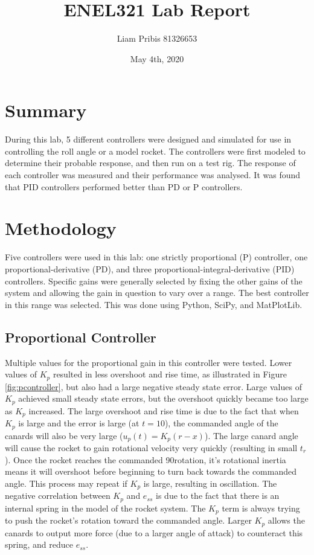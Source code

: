 \documentclass[12pt]{article}
\title{ENEL321 Lab Report}
\author{Liam Pribis 81326653}
\date{May 4th, 2020}
\begin{document}
\clearpage\maketitle
\thispagestyle{empty}
\newpage
\setcounter{page}{1}
\section{Summary}
During this lab, 5 different controllers were designed and simulated for use in controlling the roll angle or a model rocket. The controllers were first modeled to determine their probable response, and then run on a test rig. The response of each controller was measured and their performance was analysed. It was found that PID controllers performed better than PD or P controllers.

\section{Methodology}
Five controllers were used in this lab: one strictly proportional (P) controller, one proportional-derivative (PD), and three proportional-integral-derivative (PID) controllers.
Specific gains were generally selected by fixing the other gains of the system and allowing the gain in question to vary over a range. The best controller in this range was selected.
This was done using Python, SciPy, and MatPlotLib.
\subsection{Proportional Controller}
Multiple values for the proportional gain in this controller were tested. Lower values of $K_p$
resulted in less overshoot and rise time, as illustrated in Figure \ref{fig:pcontroller}, but also had a large negative steady state error. Large values of $K_p$ achieved small steady state errors, but the overshoot quickly became too large as $K_p$ increased. The large overshoot and rise time is due to the fact that when $K_p$ is large and the error is large (at $t = 10$), the commanded angle of the canards will also be very large ($u_p(t) = K_p(r - x)$). The large canard angle will cause the rocket to gain rotational velocity very quickly (resulting in small $t_r$). Once the rocket reaches the commanded 90\degree  rotation, it's rotational inertia means it will overshoot before beginning to turn back towards the commanded angle. This process may repeat if $K_p$ is large, resulting in oscillation. The negative correlation between $K_p$ and $e_{ss}$ is due to the fact that there is an internal spring in the model of the rocket system. The $K_p$ term is always trying to push the rocket's rotation toward the commanded angle. Larger $K_p$ allows the canards to output more force (due to a larger angle of attack) to counteract this spring, and reduce $e_{ss}$.
\end{document}
